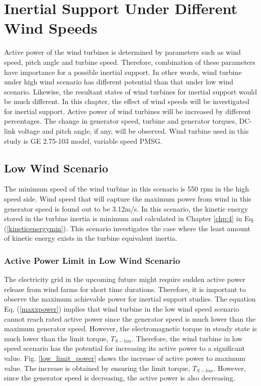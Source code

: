\section{Inertial Support Under Different Wind Speeds}
Active power of the wind turbines is determined by parameters such as wind speed, pitch angle and turbine speed. Therefore, combination of these parameters have importance for a possible inertial support. In other words, wind turbine under high wind scenario has different potential than that under low wind scenario. Likewise, the resultant states of wind turbines for inertial support would be much different. In this chapter, the effect of wind speeds will be investigated for inertial support. Active power of wind turbines will be increased by different percentages. The change in generator speed, turbine and generator torques, DC-link voltage and pitch angle, if any, will be observed. Wind turbine used in this study is GE 2.75-103 model, variable speed PMSG.
\subsection{Low Wind Scenario}
\label{sec:lowwind}
The minimum speed of the wind turbine in this scenario is 550 rpm in the high speed side. Wind speed that will capture the maximum power from wind in this generator speed is found out to be 3.12m/s. In this scenario, the kinetic energy stored in the turbine inertia is minimum and calculated in Chapter \ref{chp:4} in Eq. (\ref{kineticenergymin}). This scenario investigates the case where the least amount of kinetic energy exists in the turbine equivalent inertia.\par
\subsubsection{Active Power Limit in Low Wind Scenario}
The electricity grid in the upcoming future might require sudden active power release from wind farms for short time durations. Therefore, it is important to observe the maximum achievable power for inertial support studies. The equation Eq. (\ref{maxxpower}) implies that wind turbine in the low wind speed scenario cannot reach rated active power since the generator speed is much lower than the maximum generator speed. However, the electromagnetic torque in steady state is much lower than the limit torque, $T_{S-lim}$. Therefore, the wind turbine in low speed scenario has the potential for increasing its active power to a significant value. Fig. \ref{low_limit_power} shows the increase of active power to maximum value. The increase is obtained by ensuring the limit torque, $T_{S-lim}$. However, since the generator speed is decreasing, the active power is also decreasing. 

